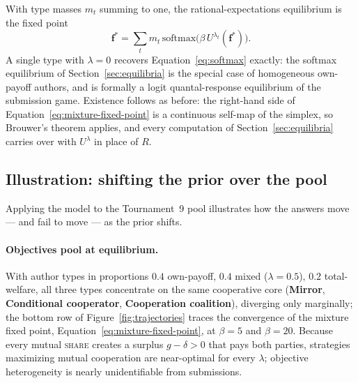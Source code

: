 With type masses $m_t$ summing to one, the rational-expectations
equilibrium is the fixed point
\begin{equation}
  \mathbf{f}^* = \sum_t m_t\,
  \mathrm{softmax}\!\big(\beta\, U^{\lambda_t}(\mathbf{f}^*)\big).
  \label{eq:mixture-fixed-point}
\end{equation}
A single type with $\lambda = 0$ recovers
Equation~\eqref{eq:softmax} exactly: the softmax equilibrium of
Section~\ref{sec:equilibria} is the special case of homogeneous
own-payoff authors, and is formally a logit quantal-response
equilibrium \citep{mckelvey1995quantal} of the submission game.
Existence follows as before: the right-hand side of
Equation~\eqref{eq:mixture-fixed-point} is a continuous self-map of
the simplex, so Brouwer's theorem applies, and every computation of
Section~\ref{sec:equilibria} carries over with $U^\lambda$ in place
of $R$.

\subsection{Illustration: shifting the prior over the pool}
\label{sec:bayesian-illustration}

Applying the model to the Tournament~9 pool
illustrates how the answers move --- and fail to move --- as the prior shifts.

\paragraph{Objectives pool at equilibrium.}
With author types in proportions $0.4$ own-payoff, $0.4$ mixed
($\lambda = 0.5$), $0.2$ total-welfare, all three types concentrate on
the same cooperative core
(\textbf{Mirror}, \textbf{Conditional cooperator},
\textbf{Cooperation coalition}), diverging only marginally; the
bottom row of Figure~\ref{fig:trajectories} traces the convergence of
the mixture fixed point, Equation~\eqref{eq:mixture-fixed-point}, at
$\beta = 5$ and $\beta = 20$.
Because every mutual \textup{\textsc{share}} creates a surplus
$g - \delta > 0$ that pays both parties, strategies maximizing mutual
cooperation are near-optimal for every $\lambda$; objective
heterogeneity is nearly unidentifiable from submissions.

